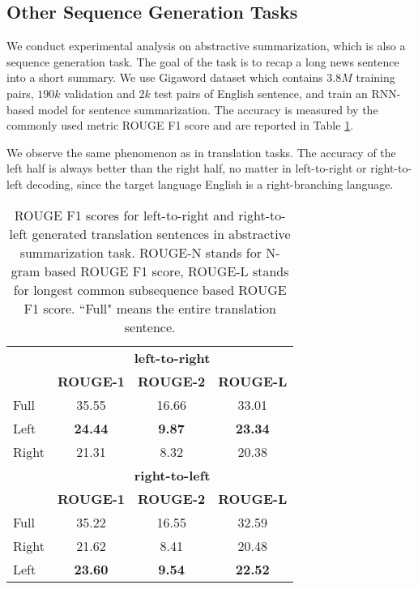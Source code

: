 \documentclass[11pt,a4paper]{article}
\begin{document}
\subsection{Other Sequence Generation Tasks}
We conduct experimental analysis on abstractive summarization, which is also a sequence generation task. The goal of the task is to recap a long news sentence into a short summary. We use Gigaword dataset which contains $3.8M$ training pairs, $190k$ validation and $2k$ test pairs of English sentence, and train an RNN-based model for sentence summarization. The accuracy is measured by the commonly used metric ROUGE F1 score and are reported in Table \ref{summarization}.

We observe the same phenomenon as in translation tasks. The accuracy of the left half is always better than the right half, no matter in left-to-right or right-to-left decoding, since the target language English is a right-branching language. %

\begin{table}[tbp]
\centering
\small
\begin{tabular}{l c c c }
\toprule
& \multicolumn{3}{c}{\textbf{left-to-right}}  \\
\cmidrule{2-4}

& \textbf{ROUGE-1} & \textbf{ROUGE-2} &  \textbf{ROUGE-L}\\
\midrule
Full & 35.55 & 16.66 & 33.01 \\
\midrule
Left & \textbf{24.44} & \textbf{9.87} & \textbf{23.34} \\
Right & 21.31 & 8.32 & 20.38  \\
\bottomrule
 & \multicolumn{3}{c}{\textbf{right-to-left}}   \\
 \cmidrule{2-4}

 & \textbf{ROUGE-1} & \textbf{ROUGE-2} & \textbf{ROUGE-L} \\
\midrule
Full & 35.22 & 16.55 & 32.59  \\
\midrule
Right & 21.62 & 8.41 & 20.48 \\
Left & \textbf{23.60} & \textbf{9.54} & \textbf{22.52}  \\

\bottomrule

\end{tabular}
\caption{ROUGE F1 scores for left-to-right and right-to-left generated translation sentences in abstractive summarization task. ROUGE-N stands for N-gram based ROUGE F1 score, ROUGE-L stands for longest common subsequence based ROUGE F1 score. ``Full" means the entire translation sentence.}
\label{summarization}
\end{table}
\end{document}
